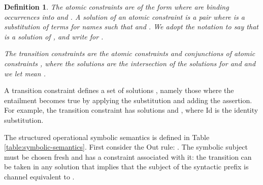 \documentclass{eptcs}
\newtheorem{definition}{Definition}
\newtheorem{lemma}[definition]{Lemma}
\theoremstyle{definition}
\begin{document}
\begin{definition}
The {\em atomic constraints} are of the form
 where  are binding
occurrences into  and . A {\em solution} of an
atomic constraint is a pair  where  is a
substitution of terms for names such that  and
. We adopt the notation  to say that  is a solution of , and write
 for .

The {\em transition constraints} are the atomic
constraints  and conjunctions of atomic constraints , where the
solutions are the intersection of the solutions for  and  and we let
 mean .
\end{definition}
A transition constraint  defines a set of solutions ,
namely those where the entailment becomes true by applying the substitution and
adding the assertion.
For example, the transition constraint  has
solutions  and , where Id is the
identity substitution.

The structured operational symbolic
semantics is defined in Table \ref{table:symbolic-semantics}.
First consider
the {\sc Out} rule:
.
The symbolic subject  must be chosen fresh and has a constraint
associated with it: the transition can be taken in any solution that implies
that the subject  of the syntactic prefix is channel equivalent to .


\begin{comment}
\TODO{Symbolic unification is only needed if we have pattern matching.}
\begin{definition}[Symbolic unification]
\label{def:symbolicunification}
 symbolically unifies  and  where  and , written , if and only
if  such that  we have that .
\end{definition}

\begin{lemma}
\label{lemma:unif1}
 If  where ,
then .
\end{lemma}
\begin{proof}
 We need to show that , which is clearly true.
\end{proof}

\begin{lemma}
\label{lemma:unif2} DOES NOT HOLD!!
 If  where 
then  such that ,
, and .
\end{lemma}
\end{comment}
\end{document}
